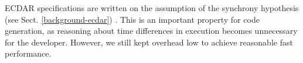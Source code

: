 ECDAR specifications are written on the assumption of the synchrony
hypothesis (see Sect. \ref{background-ecdar}) \cite{david_compositional_2012}.
This is an important property for code generation, as reasoning about
time differences in execution becomes unnecessary for the developer.
However, we still kept overhead low to achieve reasonable fast performance.



